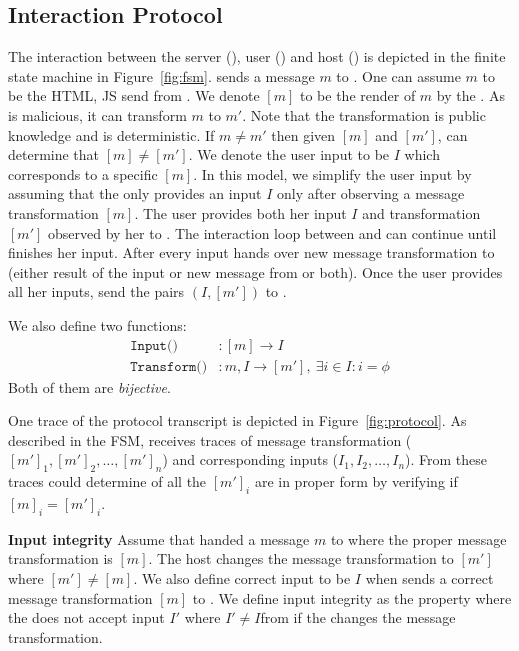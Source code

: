 \subsection{Interaction Protocol} 
\label{appendix:security:protocol}


The interaction between the server (\server), user (\user) and host (\host) is depicted in the finite state machine in Figure~\ref{fig:fsm}. \server sends a message $m$ to \host. One can assume $m$ to be the HTML, JS send from \server. We denote $[m]$ to be the render of $m$ by the \host. As \host is malicious, it can transform $m$ to $m'$. Note that the transformation is public knowledge and is deterministic. If $m\neq m'$ then given $[m]$ and $[m']$, \server can determine that $[m]\neq [m']$. We denote the user input to be $I$ which corresponds to a specific $[m]$. 
In this model, we simplify the user input by assuming that the \user only provides an input $I$ only after observing a message transformation $[m]$. The user provides both her input $I$ and transformation $[m']$ observed by her to \host. The interaction loop between \host and \user can continue until \user finishes her input. After every input \host hands over new message transformation to \user (either result of the input or new message from \server or both). Once the user provides all her inputs, \host send the pairs $(I, [m'])$ to \server.

We also define two functions:
\begin{align*}
\texttt{Input()}&:[m]\rightarrow I \\
\texttt{Transform()}&:m,I\rightarrow [m'],\ \exists i\in I:i=\phi
\end{align*}
Both of them are \emph{bijective}.

One trace of the protocol transcript is depicted in Figure~\ref{fig:protocol}. As described in the FSM, \server receives traces of message transformation ($[m']_1,[m']_2,\ldots,[m']_n$) and corresponding inputs ($I_1,I_2,\ldots,I_n$). From these traces \server could determine of all the $[m']_i$ are in proper form by verifying if $[m]_i=[m']_i$.

\begin{definition}{\textbf{Input integrity}}
\label{def:inputIntegrity}
Assume that \server handed a message $m$ to \host where the proper message transformation is $[m]$. The host changes the message transformation to $[m']$ where $[m']\neq [m]$. We also define correct \user input to be $I$ when \host sends a correct message transformation $[m]$ to \user. We define input integrity as the property where the \server does not accept input $I'$ where $I'\neq I$from \user if the \host changes the message transformation.
\end{definition}

